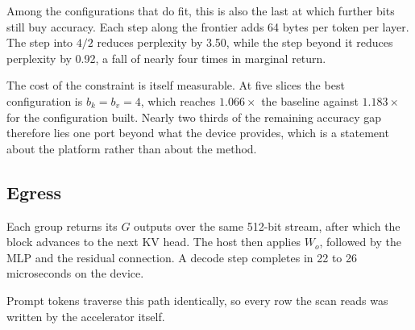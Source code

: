 Among the configurations that do fit, this is also the last at which
further bits still buy accuracy. Each step along the frontier adds 64
bytes per token per layer. The step into $4/2$ reduces perplexity by
3.50, while the step beyond it reduces perplexity by 0.92, a fall of
nearly four times in marginal return.

The cost of the constraint is itself measurable. At five slices the best
configuration is $b_k{=}b_v{=}4$, which reaches $1.066\times$ the
baseline against $1.183\times$ for the configuration built. Nearly two
thirds of the remaining accuracy gap therefore lies one port beyond what
the device provides, which is a statement about the platform rather than
about the method.

\subsection{Egress}

Each group returns its $G$ outputs over the same 512-bit stream, after
which the block advances to the next KV head. The host then applies
$W_o$, followed by the MLP and the residual connection. A decode step
completes in 22 to 26 microseconds on the device.

Prompt tokens traverse this path identically, so every row the scan
reads was written by the accelerator itself.
